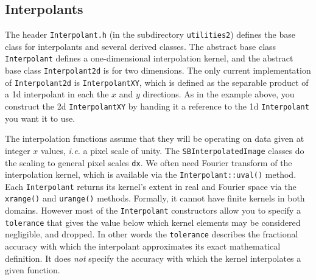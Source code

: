 \documentclass[11pt,preprint,flushrt]{aastex}
\begin{document}
\subsection{Interpolants}
The header {\tt Interpolant.h} (in the subdirectory {\tt utilities2}) defines the base class for interpolants and several derived classes.  The abstract base class {\tt Interpolant} defines a one-dimensional interpolation kernel, and the abstract base class {\tt Interpolant2d} is for two dimensions.  The only current implementation of {\tt Interpolant2d} is {\tt InterpolantXY}, which is defined as the separable product of a 1d interpolant in each the $x$ and $y$ directions.  As in the example above, you construct the 2d {\tt InterpolantXY} by handing it a reference to the 1d {\tt Interpolant} you want it to use.

The interpolation functions assume that they will be operating on data given at integer $x$ values, {\it i.e.} a pixel scale of unity.  The {\tt SBInterpolatedImage} classes do the scaling to general pixel scales {\tt dx}.  We often need Fourier transform of the interpolation kernel, which is available via the {\tt Interpolant::uval()} method.  Each {\tt Interpolant} returns its kernel's extent in real and Fourier space via the {\tt xrange()} and {\tt urange()} methods.  Formally, it cannot have finite kernels in both domains.  However most of the {\tt Interpolant} constructors allow you to specify a {\tt tolerance} that gives the value below which kernel elements may be considered negligible, and dropped.  In other words the {\tt tolerance} describes the fractional accuracy with which the interpolant approximates its exact mathematical definition.  It does {\em not} specify the accuracy with which the kernel interpolates a given function.
\end{document}

